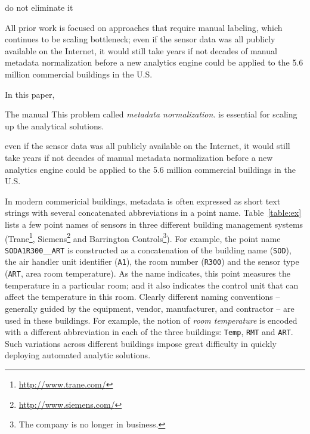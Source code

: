   do not eliminate it

All prior work is focused on approaches that require manual labeling, which 
continues to be scaling bottleneck;
even if the sensor data was all publicly available on the Internet, it would still take years if not decades of manual metadata normalization before a new analytics engine could be applied to the 5.6 million commercial buildings in the U.S.


In this paper, 


The manual This problem called {\em metadata
  normalization}.  is essential for scaling up the analytical solutions.


even if the sensor data was all publicly available on the Internet, it would still take years if not decades of manual metadata normalization before a new analytics engine could be applied to the 5.6 million commercial buildings in the U.S.

In modern commericial buildings,
metadata is often expressed as short
text strings with several concatenated abbreviations in a point name. Table~\ref{table:ex} lists
a few point names of sensors in three different building management systems
(Trane\footnote{\url{http://www.trane.com/}}, Siemens\footnote{\url{http://www.siemens.com/}}
and Barrington Controls\footnote{The company is no longer in business.}).
For example, the point name \texttt{SODA1R300\_\_ART} is constructed as a
concatenation of the building name (\texttt{SOD}), the air handler unit
identifier (\texttt{A1}), the room number (\texttt{R300}) and the sensor type
(\texttt{ART}, area room temperature). As the name indicates, this point measures
the temperature in a particular room; and it also indicates the control unit that
can affect the temperature in this room. Clearly different naming conventions --
generally guided by the equipment, vendor, manufacturer,
and contractor --
are used in these buildings. For example, the notion of {\em room temperature} is encoded
with a different abbreviation in each of the three buildings: \texttt{Temp}, \texttt{RMT} and \texttt{ART}.
Such variations across different buildings impose great difficulty in quickly deploying automated analytic
solutions.


